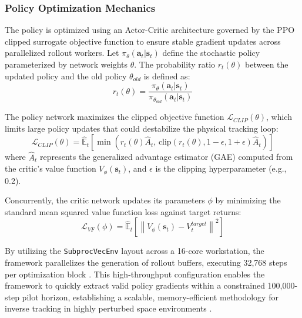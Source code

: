 \documentclass[letterpaper,11pt]{AAS}
\begin{document}
\subsubsection{Policy Optimization Mechanics}
The policy is optimized using an Actor-Critic architecture governed by the PPO clipped surrogate objective function to ensure stable gradient updates across parallelized rollout workers. Let $\pi_\theta(\mathbf{a}_t | \mathbf{s}_t)$ define the stochastic policy parameterized by network weights $\theta$. The probability ratio $r_t(\theta)$ between the updated policy and the old policy $\theta_{old}$ is defined as:
\begin{equation}
    r_t(\theta) = \frac{\pi_\theta(\mathbf{a}_t | \mathbf{s}_t)}{\pi_{\theta_{old}}(\mathbf{a}_t | \mathbf{s}_t)}
    \label{eq:probability_ratio}
\end{equation}

The policy network maximizes the clipped objective function $\mathcal{L}_{CLIP}(\theta)$, which limits large policy updates that could destabilize the physical tracking loop:
\begin{equation}
    \mathcal{L}_{CLIP}(\theta) = \hat{\mathbb{E}}_t \left[ \min\left( r_t(\theta)\hat{A}_t, \, \text{clip}\left(r_t(\theta), 1-\epsilon, 1+\epsilon\right)\hat{A}_t \right) \right]
    \label{eq:ppo_clip_objective}
\end{equation}
where $\hat{A}_t$ represents the generalized advantage estimator (GAE) computed from the critic's value function $V_\phi(\mathbf{s}_t)$, and $\epsilon$ is the clipping hyperparameter (e.g., 0.2). 

Concurrently, the critic network updates its parameters $\phi$ by minimizing the standard mean squared value function loss against target returns:
\begin{equation}
    \mathcal{L}_{VF}(\phi) = \hat{\mathbb{E}}_t \left[ \left\| V_\phi(\mathbf{s}_t) - V_t^{target} \right\|^2 \right]
    \label{eq:ppo_value_loss}
\end{equation}

By utilizing the \texttt{SubprocVecEnv} layout across a 16-core workstation, the framework parallelizes the generation of rollout buffers, executing 32,768 steps per optimization block \cite{Abstract_AIAA_ASC_2026.pdf}. This high-throughput configuration enables the framework to quickly extract valid policy gradients within a constrained 100,000-step pilot horizon, establishing a scalable, memory-efficient methodology for inverse tracking in highly perturbed space environments \cite{Abstract_AIAA_ASC_2026.pdf}.
\end{document}

